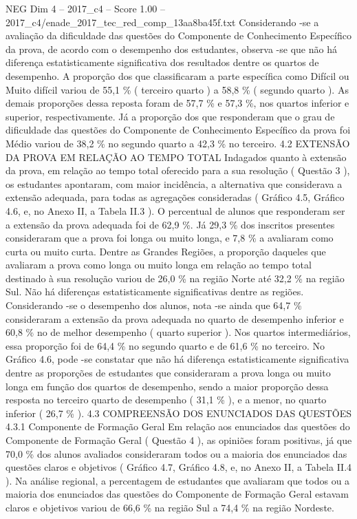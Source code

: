 \begin{textsample}{NEG Dim 4 – 2017\_c4 – Score 1.00 – 2017\_c4/enade\_2017\_tec\_red\_comp\_13aa8ba45f.txt}
Considerando -se a avaliação da dificuldade das questões do Componente de Conhecimento Específico da prova, de acordo com o desempenho dos estudantes, observa -se que não há diferença estatisticamente significativa dos resultados dentre os quartos de desempenho.
A proporção dos que classificaram a parte específica como Difícil ou Muito difícil variou de 55,1 \% ( terceiro quarto ) a 58,8 \% ( segundo quarto ).
As demais proporções dessa reposta foram de 57,7 \% e 57,3 \%, nos quartos inferior e superior, respectivamente.
Já a proporção dos que responderam que o grau de dificuldade das questões do Componente de Conhecimento Específico da prova foi Médio variou de 38,2 \% no segundo quarto a 42,3 \% no terceiro. 4.2 EXTENSÃO DA PROVA EM RELAÇÃO AO TEMPO TOTAL Indagados quanto à extensão da prova, em relação ao tempo total oferecido para a sua resolução ( Questão 3 ), os estudantes apontaram, com maior incidência, a alternativa que considerava a extensão adequada, para todas as agregações consideradas ( Gráfico 4.5, Gráfico 4.6, e, no Anexo II, a Tabela II.3 ).
O percentual de alunos que responderam ser a extensão da prova adequada foi de 62,9 \%.
Já 29,3 \% dos inscritos presentes consideraram que a prova foi longa ou muito longa, e 7,8 \% a avaliaram como curta ou muito curta.
Dentre as Grandes Regiões, a proporção daqueles que avaliaram a prova como longa ou muito longa em relação ao tempo total destinado à sua resolução variou de 26,0 \% na região Norte até 32,2 \% na região Sul.
Não há diferenças estatisticamente significativas dentre as regiões.
Considerando -se o desempenho dos alunos, nota -se ainda que 64,7 \% consideraram a extensão da prova adequada no quarto de desempenho inferior e 60,8 \% no de melhor desempenho ( quarto superior ).
Nos quartos intermediários, essa proporção foi de 64,4 \% no segundo quarto e de 61,6 \% no terceiro.
No Gráfico 4.6, pode -se constatar que não há diferença estatisticamente significativa dentre as proporções de estudantes que consideraram a prova longa ou muito longa em função dos quartos de desempenho, sendo a maior proporção dessa resposta no terceiro quarto de desempenho ( 31,1 \% ), e a menor, no quarto inferior ( 26,7 \% ). 4.3 COMPREENSÃO DOS ENUNCIADOS DAS QUESTÕES 4.3.1 Componente de Formação Geral Em relação aos enunciados das questões do Componente de Formação Geral ( Questão 4 ), as opiniões foram positivas, já que 70,0 \% dos alunos avaliados consideraram todos ou a maioria dos enunciados das questões claros e objetivos ( Gráfico 4.7, Gráfico 4.8, e, no Anexo II, a Tabela II.4 ).
Na análise regional, a percentagem de estudantes que avaliaram que todos ou a maioria dos enunciados das questões do Componente de Formação Geral estavam claros e objetivos variou de 66,6 \% na região Sul a 74,4 \% na região Nordeste.

\end{textsample}
